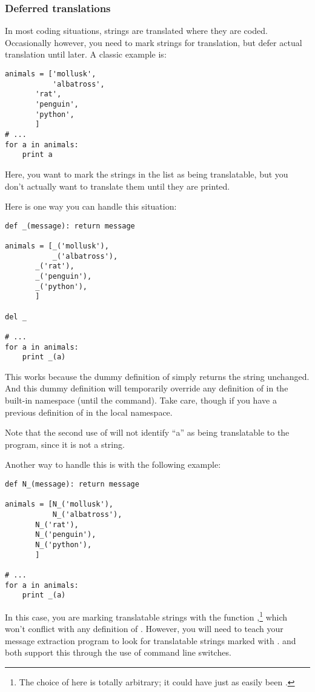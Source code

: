 \subsubsection{Deferred translations}

In most coding situations, strings are translated where they are coded.
Occasionally however, you need to mark strings for translation, but
defer actual translation until later.  A classic example is:

\begin{verbatim}
animals = ['mollusk',
           'albatross',
	   'rat',
	   'penguin',
	   'python',
	   ]
# ...
for a in animals:
    print a
\end{verbatim}

Here, you want to mark the strings in the  list as being
translatable, but you don't actually want to translate them until they
are printed.

Here is one way you can handle this situation:

\begin{verbatim}
def _(message): return message

animals = [_('mollusk'),
           _('albatross'),
	   _('rat'),
	   _('penguin'),
	   _('python'),
	   ]

del _

# ...
for a in animals:
    print _(a)
\end{verbatim}

This works because the dummy definition of \function{_()} simply returns
the string unchanged.  And this dummy definition will temporarily
override any definition of \function{_()} in the built-in namespace
(until the  command).
Take care, though if you have a previous definition of \function{_} in
the local namespace.

Note that the second use of \function{_()} will not identify ``a'' as
being translatable to the  program, since it is not
a string.

Another way to handle this is with the following example:

\begin{verbatim}
def N_(message): return message

animals = [N_('mollusk'),
           N_('albatross'),
	   N_('rat'),
	   N_('penguin'),
	   N_('python'),
	   ]

# ...
for a in animals:
    print _(a)
\end{verbatim}

In this case, you are marking translatable strings with the function
,\footnote{The choice of  here is totally
arbitrary; it could have just as easily been
.
} which won't conflict with any definition of
\function{_()}.  However, you will need to teach your message extraction
program to look for translatable strings marked with .
 and  both support this through the
use of command line switches.

